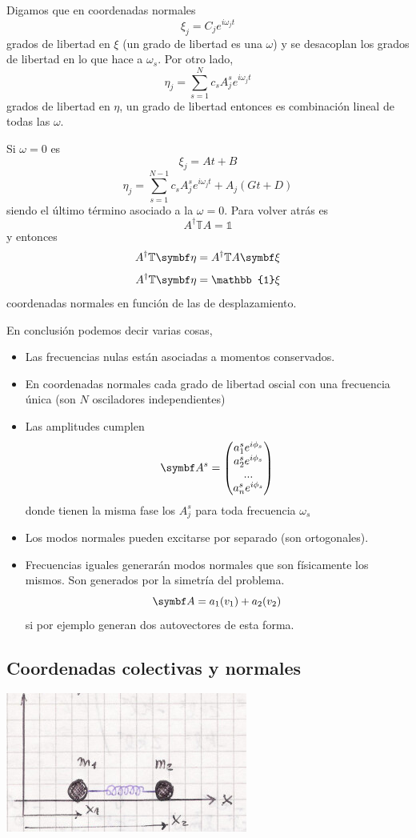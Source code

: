 \documentclass[10pt,oneside]{CBFT_book}
\begin{document}
Digamos que en coordenadas normales
\[
	\xi_j = C_j e^{i \omega_j t}
\]
grados de libertad en $\xi$ (un grado de libertad es una $\omega$) y se desacoplan los grados de libertad
en lo que hace a $\omega_s$.
Por otro lado,
\[
	\eta_j = \sum_{s=1}^N c_s A_j^s e^{i \omega_j t}
\]
grados de libertad en $\eta$, un grado de libertad entonces es combinación lineal de todas las $\omega$.

Si $\omega=0$ es 
\[
	\xi_j = At + B 
\]
\[
	\eta_j = \sum_{s=1}^{N-1} c_s A_j^s e^{i \omega_j t} + A_j(Gt + D)
\]
siendo el último término asociado a la $\omega=0$.
Para volver atrás es 
\[
	A^{\dagger} \mathbb{T} A = \mathbb{1}
\]
y entonces 
\[
	A^{\dagger} \mathbb{T} \vb{\eta} = A^{\dagger} \mathbb{T} A \vb{\xi}  
\]
\[
	A^{\dagger} \mathbb{T} \vb{\eta} = \mathbb{1} \xi
\]
coordenadas normales en función de las de desplazamiento.

En conclusión podemos decir varias cosas,
\begin{itemize}
 \item Las frecuencias nulas están asociadas a momentos conservados.
 \item En coordenadas normales cada grado de libertad oscial con una frecuencia única (son $N$
	osciladores independientes)
 \item Las amplitudes cumplen
 \[ \vb{A}^s =
 \begin{pmatrix}
  a_1^s e^{i \phi_s} \\
  a_2^s e^{i \phi_s} \\
  ... \\
  a_n^s e^{i \phi_s}
 \end{pmatrix}
 \]
 donde tienen la misma fase los $A_j^s$ para toda frecuencia $\omega_s$
 \item Los modos normales pueden excitarse por separado (son ortogonales).
 \item Frecuencias iguales generarán modos normales que son físicamente los
 mismos. Son generados por la simetría del problema.
 \[
	\vb{A} = a_1(v_1) + a_2(v_2)
 \]
 si por ejemplo generan dos autovectores de esta forma.
\end{itemize}

\subsection{Coordenadas colectivas y normales}

\includegraphics[scale=0.5]{images/fig_mc_coord_normales_colectivas.jpg}
\end{document}
